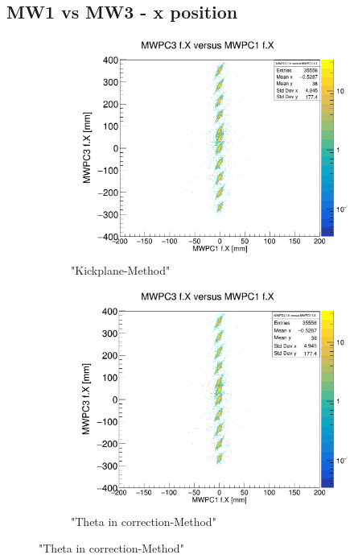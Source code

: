 \documentclass[12pt, letterpaper]{article}
\begin{document}
\subsection{MW1 vs MW3 - x position}
\begin{figure}[!htbp]
\begin{subfigure}{.5\textwidth}
  \centering
  \includegraphics[width=.9\linewidth]{plot_imgs/mw3_mw1_get_centr.png}  
  \caption{"Kickplane-Method"}
  \label{fig:sub-first}
\end{subfigure}
\begin{subfigure}{.5\textwidth}
  \centering
  \includegraphics[width=.9\linewidth]{plot_imgs/mw3_mw1_corr.png} 
  \caption{"Theta \textunderscore in correction-Method"}
  \label{fig:sub-second}

\end{subfigure}
\end{figure}
\end{document}
